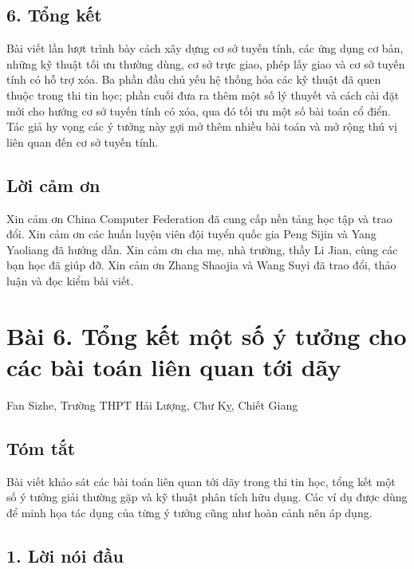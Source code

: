\documentclass[11pt]{article}
\begin{document}
\subsection*{6. Tổng kết}

Bài viết lần lượt trình bày cách xây dựng cơ sở tuyến tính, các ứng dụng cơ
bản, những kỹ thuật tối ưu thường dùng, cơ sở trực giao, phép lấy giao và cơ sở
tuyến tính có hỗ trợ xóa. Ba phần đầu chủ yếu hệ thống hóa các kỹ thuật đã quen
thuộc trong thi tin học; phần cuối đưa ra thêm một số lý thuyết và cách cài đặt
mới cho hướng cơ sở tuyến tính có xóa, qua đó tối ưu một số bài toán cổ điển.
Tác giả hy vọng các ý tưởng này gợi mở thêm nhiều bài toán và mở rộng thú vị
liên quan đến cơ sở tuyến tính.

\subsection*{Lời cảm ơn}

Xin cảm ơn China Computer Federation đã cung cấp nền tảng học tập và trao đổi.
Xin cảm ơn các huấn luyện viên đội tuyển quốc gia Peng Sijin và Yang Yaoliang
đã hướng dẫn. Xin cảm ơn cha mẹ, nhà trường, thầy Li Jian, cùng các bạn học đã
giúp đỡ. Xin cảm ơn Zhang Shaojia và Wang Suyi đã trao đổi, thảo luận và đọc
kiểm bài viết.

\section*{Bài 6. Tổng kết một số ý tưởng cho các bài toán liên quan tới dãy}

\begin{center}
Fan Sizhe, Trường THPT Hải Lượng, Chư Kỵ, Chiết Giang
\end{center}

\subsection*{Tóm tắt}

Bài viết khảo sát các bài toán liên quan tới dãy trong thi tin học, tổng kết
một số ý tưởng giải thường gặp và kỹ thuật phân tích hữu dụng. Các ví dụ được
dùng để minh họa tác dụng của từng ý tưởng cũng như hoàn cảnh nên áp dụng.

\subsection*{1. Lời nói đầu}
\end{document}
